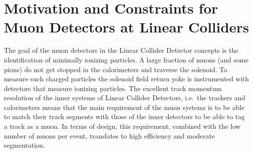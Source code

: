 \section{Motivation and Constraints for Muon Detectors at Linear Colliders}

The goal of the muon detectors in the Linear Collider Detector concepts is the identification of minimally ionizing particles. A large fraction of muons (and some pions) do not get stopped in the calorimeters and traverse the solenoid. To measure such charged particles the solenoid field return yoke is instrumented with detectors that measure ionizing particles. The excellent track momentum resolution of the inner systems of Linear Collider Detectors, i.e.\ the trackers and calorimeters means that the main requirement of the muon systems is to be able to match their track segments with those of the inner detectors to be able to tag a track as a muon. In terms of design, this requirement, combined with the low number of muons per event, translates to high efficiency and moderate segmentation.
